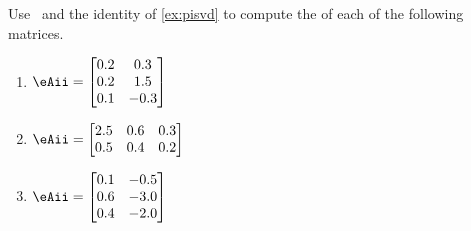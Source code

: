 \begin{exercise} \label{ex:} 
Use \script\ and the identity of \autoref{ex:pisvd} to compute the  of each of the following matrices.
\begin{enumerate}
\item \(\eAii=\begin{bmatrix} 0.2&0.3
\\0.2&1.5
\\0.1&-0.3 \end{bmatrix}\)
\setbox\ajrqrbox\hbox{\qrcode{%
\eAii=[0.2 0.3
0.2 1.5
0.1 -0.3]
}}%
\marginpar{\usebox{\ajrqrbox\\[2ex]}}%

\item \(\eAii=\begin{bmatrix} 2.5&0.6&0.3
\\0.5&0.4&0.2 \end{bmatrix}\)
\setbox\ajrqrbox\hbox{\qrcode{%
\eAii=[2.5 0.6 0.3
0.5 0.4 0.2]
}}%
\marginpar{\usebox{\ajrqrbox\\[2ex]}}%

\item \(\eAii=\begin{bmatrix} 0.1&-0.5
\\0.6&-3.0
\\0.4&-2.0 \end{bmatrix}\)
\setbox\ajrqrbox\hbox{\qrcode{%
\eAii=[0.1 -0.5
0.6 -3.0
0.4 -2.0]
}}%
\marginpar{\usebox{\ajrqrbox\\[2ex]}}%


\end{enumerate}
\end{exercise}
